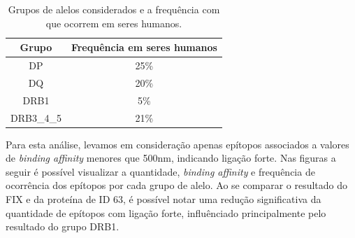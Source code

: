     \begin{table}[]
        \begin{tabular}{|c|c|}
        \hline
        \rowcolor[HTML]{C0C0C0} 
        {\color[HTML]{343434} Grupo} & {\color[HTML]{343434} Frequência em seres humanos} \\ \hline
        DP                                                                         & 25\%                                                                           \\ \hline
        DQ                                                                         & 20\%                                                                           \\ \hline
        DRB1                                                                       & 5\%                                                                            \\ \hline
        DRB3\_4\_5                                                                 & 21\%                                                                           \\ \hline
        \end{tabular}
        \caption{Grupos de alelos considerados e a frequência com que ocorrem em seres humanos.}
        \label{tab:alelo_grupos}
        \end{table}


Para esta análise, levamos em consideração apenas epítopos associados a valores de \textit{binding affinity} 
menores que 500nm, indicando ligação forte. 
Nas figuras a seguir é possível visualizar a quantidade, \textit{binding affinity} e frequência de ocorrência 
dos epítopos por cada grupo de alelo. Ao se comparar o resultado do FIX e da proteína de ID 63,
é possível notar uma redução significativa da quantidade de epítopos com ligação forte, influênciado principalmente 
pelo resultado do grupo DRB1. 

